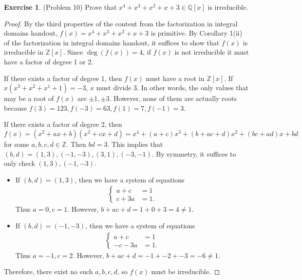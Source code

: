 \documentclass[12pt, psamsfonts]{amsart}
\theoremstyle{definition}
\newtheorem*{exer}{Exercise}
\theoremstyle{remark}
\numberwithin{equation}{section}
\begin{document}
\begin{exer}{(Problem 10)}
  Prove that $x^4 + x^3 + x^2 + x + 3 \in \mathbb{Q}[x]$ is irreducible.
\end{exer}

\begin{proof}
  By the third properties of the content from the factorization in integral domains handout, $f(x) = x^4 + x^3 + x^2 + x + 3$ is primitive.
  By Corollary 1(ii) of the factorization in integral domains handout, it suffices to show that $f(x)$ is irreducible in $\mathbb{Z}[x]$.
  Since $\deg(f(x)) = 4$, if $f(x)$ is not irreducible it must have a factor of degree 1 or 2.

  If there exists a factor of degree 1, then $f(x)$ must have a root in $\mathbb{Z}[x]$.
  If $x(x^3 + x^2 + x^1 + 1) = -3$, $x$ must divide 3.
  In other words, the only values that may be a root of $f(x)$ are $\pm 1, \pm 3$.
  However, none of them are actually roots because $f(3) = 123, f(-3) = 63, f(1) = 7, f(-1) = 3$.

  If there exists a factor of degree 2, then $f(x) = (x^2 + ax + b)(x^2 + cx + d) = x^4 + (a + c)x^3 + (b + ac + d)x^2 + (bc + ad)x + bd$ for some $a, b, c, d \in \mathbb{Z}$.
  Then $bd = 3$.
  This implies that $(b, d) = (1, 3), (-1, -3), (3, 1), (-3, -1)$.
  By symmetry, it suffices to only check $(1, 3), (-1, -3)$.
  \begin{itemize}
    \item
      If $(b, d) = (1, 3)$, then we have a system of equations
      \begin{align*}
        \begin{cases}
          a + c &= 1 \\
          c + 3a &= 1.
        \end{cases}
      \end{align*}
      Thus $a = 0, c = 1$.
      However, $b + ac + d = 1 + 0 + 3 = 4 \ne 1$.
    \item
      If $(b, d) = (-1, -3)$, then we have a system of equations
      \begin{align*}
        \begin{cases}
          a + c &= 1 \\
          -c - 3a &= 1.
        \end{cases}
      \end{align*}
      Thus $a = -1, c = 2$.
      However, $b + ac + d = -1 + -2 + -3 = -6 \ne 1$.
  \end{itemize}
  Therefore, there exist no such $a, b, c, d$, so $f(x)$ must be irreducible.
\end{proof}
\end{document}
